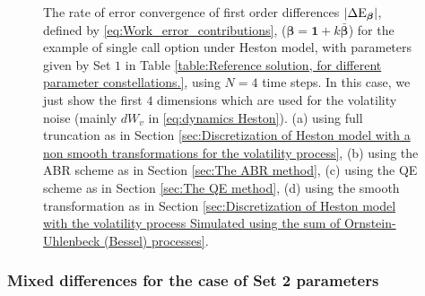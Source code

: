 \begin{figure}[htb]
	\caption{The rate of error convergence of first order differences $\left\lvert\Delta \text{E}_{\boldsymbol{\beta}}\right\rvert$, defined by \eqref{eq:Work_error_contributions}, ($\boldsymbol{\beta}=\mathbf{1}+k \bar{\boldsymbol{\beta}}$) for the example of single call option under Heston model, with parameters given by Set $1$ in Table \ref{table:Reference solution, for different parameter constellations.},  using $N=4$ time steps. In this case, we just show  the first  $4$ dimensions which are used for the volatility noise (mainly $dW_v$ in \eqref{eq:dynamics Heston}). (a) using full truncation as in Section \ref{sec:Discretization of Heston model with a non smooth transformations for the volatility process}, (b) using the ABR scheme as in Section \ref{sec:The ABR method}, (c) using the QE scheme as in Section \ref{sec:The QE method}, (d) using the smooth transformation as in Section \ref{sec:Discretization of Heston model with the volatility process Simulated using the sum of  Ornstein-Uhlenbeck (Bessel) processes}.}
	\label{fig:first_diff_Heston_call_N_4_set2}	
\end{figure}
\FloatBarrier


\subsubsection*{Mixed differences for the case of Set 2 parameters}

